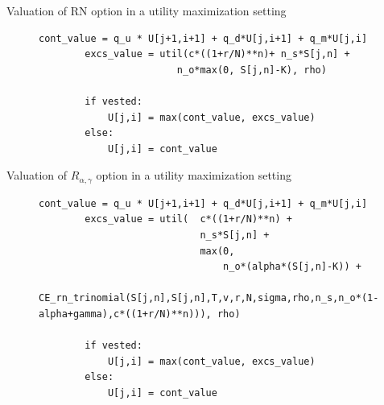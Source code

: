\documentclass[compress]{beamer}
\begin{document}
\begin{frame}[fragile]{Valuation of RN option in a utility maximization setting}
    \begin{figure}[H]
        \begin{lstlisting}[breaklines, basicstyle=\ttfamily\scriptsize]
        cont_value = q_u * U[j+1,i+1] + q_d*U[j,i+1] + q_m*U[j,i]
        excs_value = util(c*((1+r/N)**n)+ n_s*S[j,n] + 
                        n_o*max(0, S[j,n]-K), rho)
        
        if vested:
            U[j,i] = max(cont_value, excs_value)
        else: 
            U[j,i] = cont_value
        \end{lstlisting}
        \label{fig:ce_exec_rn}
    \end{figure}
\end{frame}

\begin{frame}[fragile]{Valuation of $R_{\alpha, \gamma}$ option in a utility maximization setting}
    \begin{figure}[H]
        \begin{lstlisting}[breaklines, basicstyle=\ttfamily\scriptsize]
        cont_value = q_u * U[j+1,i+1] + q_d*U[j,i+1] + q_m*U[j,i]
        excs_value = util(  c*((1+r/N)**n) +              
                            n_s*S[j,n] + 
                            max(0, 
                                n_o*(alpha*(S[j,n]-K)) + 
                                CE_rn_trinomial(S[j,n],S[j,n],T,v,r,N,sigma,rho,n_s,n_o*(1-alpha+gamma),c*((1+r/N)**n))), rho)

        if vested:
            U[j,i] = max(cont_value, excs_value)
        else: 
            U[j,i] = cont_value
        \end{lstlisting}
        \label{fig:ce_exec_r}
    \end{figure}
\end{frame}
\end{document}
